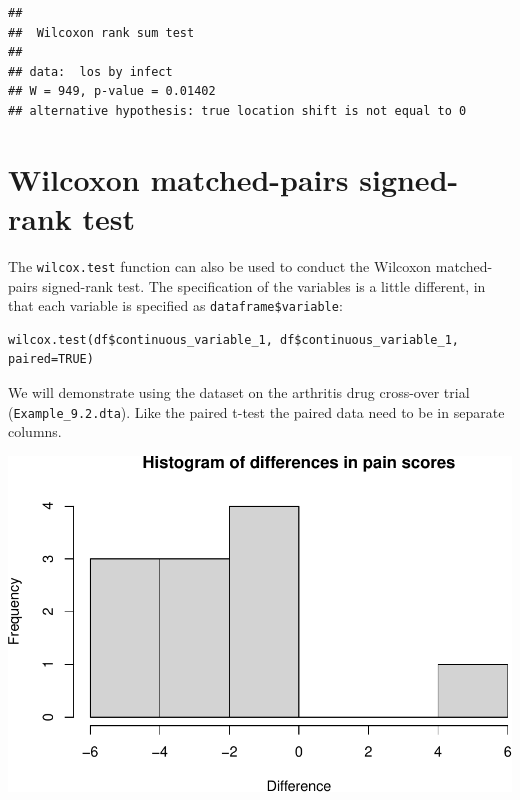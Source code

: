 \documentclass[
]{memoir}
\newenvironment{Shaded}{\begin{snugshade}}{\end{snugshade}}
\newcommand{\AttributeTok}[1]{\textcolor[rgb]{0.77,0.63,0.00}{#1}}
\newcommand{\FunctionTok}[1]{\textcolor[rgb]{0.00,0.00,0.00}{#1}}
\newcommand{\NormalTok}[1]{#1}
\newcommand{\OtherTok}[1]{\textcolor[rgb]{0.56,0.35,0.01}{#1}}
\newcommand{\SpecialCharTok}[1]{\textcolor[rgb]{0.00,0.00,0.00}{#1}}
\newcommand{\StringTok}[1]{\textcolor[rgb]{0.31,0.60,0.02}{#1}}
\begin{document}
\begin{verbatim}
## 
##  Wilcoxon rank sum test
## 
## data:  los by infect
## W = 949, p-value = 0.01402
## alternative hypothesis: true location shift is not equal to 0
\end{verbatim}

\hypertarget{wilcoxon-matched-pairs-signed-rank-test}{%
\section{Wilcoxon matched-pairs signed-rank test}\label{wilcoxon-matched-pairs-signed-rank-test}}

The \texttt{wilcox.test} function can also be used to conduct the Wilcoxon matched-pairs signed-rank test. The specification of the variables is a little different, in that each variable is specified as \texttt{dataframe\$variable}:

\begin{verbatim}
wilcox.test(df$continuous_variable_1, df$continuous_variable_1, paired=TRUE)
\end{verbatim}

We will demonstrate using the dataset on the arthritis drug cross-over trial (\texttt{Example\_9.2.dta}). Like the paired t-test the paired data need to be in separate columns.

\begin{Shaded}
\end{Shaded}

\includegraphics{phcm9795-R-notes_files/figure-latex/unnamed-chunk-108-1.pdf}
\end{document}
